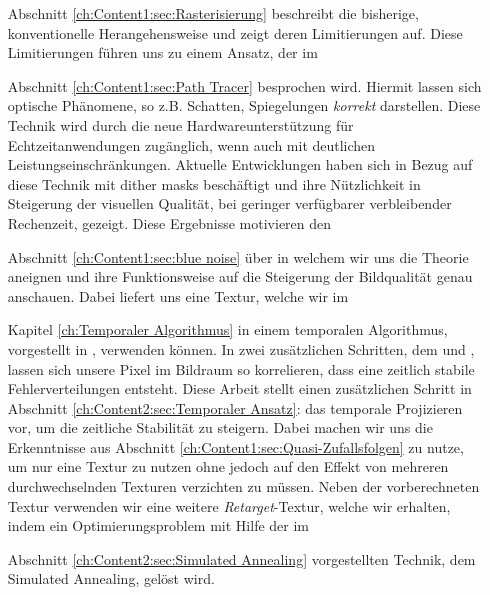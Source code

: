 \begin{itemize}
    \item[Abschnitt \ref{ch:Content1:sec:Rasterisierung}] beschreibt die bisherige, konventionelle Herangehensweise und zeigt deren Limitierungen auf. Diese 
        Limitierungen führen uns zu einem Ansatz, der im 

    \item[Abschnitt \ref{ch:Content1:sec:Path Tracer}] besprochen wird. Hiermit lassen sich optische Phänomene, so z.B. Schatten, Spiegelungen \textit{korrekt} darstellen.
        Diese Technik wird durch die neue Hardwareunterstützung für Echtzeitanwendungen zugänglich, wenn auch mit deutlichen Leistungseinschränkungen.
        Aktuelle Entwicklungen \cite{georgiev2016blue} haben sich in Bezug auf diese Technik mit  dither masks beschäftigt
        und ihre Nützlichkeit in Steigerung der visuellen Qualität, bei geringer verfügbarer verbleibender Rechenzeit, gezeigt. Diese Ergebnisse motivieren den

    \item[Abschnitt \ref{ch:Content1:sec:blue noise}] über  in welchem wir uns die Theorie aneignen und ihre Funktionsweise auf die Steigerung der 
        Bildqualität genau anschauen. Dabei liefert uns \cite{bluenoisechrisschied} eine  Textur, welche wir im

    \item[Kapitel \ref{ch:Temporaler Algorithmus}]in einem temporalen Algorithmus, vorgestellt in \cite{hal02158423}, verwenden können. In zwei zusätzlichen Schritten, dem 
     und , lassen sich unsere Pixel im Bildraum so korrelieren, dass eine zeitlich stabile Fehlerverteilungen
    entsteht. Diese Arbeit stellt einen zusätzlichen Schritt in Abschnitt \ref{ch:Content2:sec:Temporaler Ansatz}: das temporale Projizieren vor, um die zeitliche Stabilität zu steigern. 
    Dabei machen wir uns die Erkenntnisse aus Abschnitt \ref{ch:Content1:sec:Quasi-Zufallsfolgen} zu nutze, um nur eine Textur zu nutzen ohne jedoch auf den Effekt von mehreren durchwechselnden
    Texturen verzichten zu müssen. Neben der vorberechneten  Textur verwenden wir eine weitere \textit{Retarget}-Textur, welche wir erhalten, 
    indem ein Optimierungsproblem mit Hilfe der im  

    \item[Abschnitt \ref{ch:Content2:sec:Simulated Annealing}]vorgestellten Technik, dem Simulated Annealing, gelöst wird.   

\end{itemize}
 


